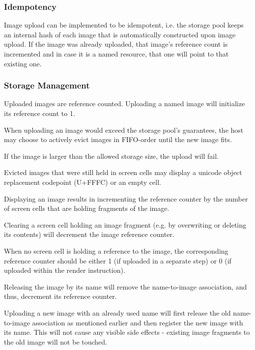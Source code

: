 \documentclass[a4paper]{article}
\begin{document}
\subsubsection{Idempotency}

Image upload can be implemented to be idempotent, i.e. the storage pool keeps an internal hash
of each image that is automatically constructed upon image upload.
If the image was already uploaded, that image's reference count is incremented
and in case it is a named resource, that one will point to that existing one.

\subsubsection{Storage Management}

Uploaded images are reference counted. Uploading a named image will initialize its reference count to 1.

When uploading an image would exceed the storage pool's guarantees,
the host may choose to actively evict images in FIFO-order until the new image fits.

If the image is larger than the allowed storage size, the upload will fail.

Evicted images that were still held in screen cells may display a
unicode object replacement codepoint (U+FFFC) or an empty cell.

Displaying an image results in incrementing the reference counter
by the number of screen cells that are holding fragments of the image.

Clearing a screen cell holding an image fragment (e.g. by overwriting
or deleting its contents) will decrement the image reference counter.

When no screen cell is holding a reference to the image,
the corresponding reference counter should be either 1 (if uploaded in a separate step)
or 0 (if uploaded within the render instruction).

Releasing the image by its name will remove the name-to-image association, and thus,
decrement its reference counter.

Uploading a new image with an already used name will first release the old name-to-image association
as mentioned earlier and then register the new image with its name. This will not cause
any visible side effects - existing image fragments to the old image will not be touched.
\end{document}

